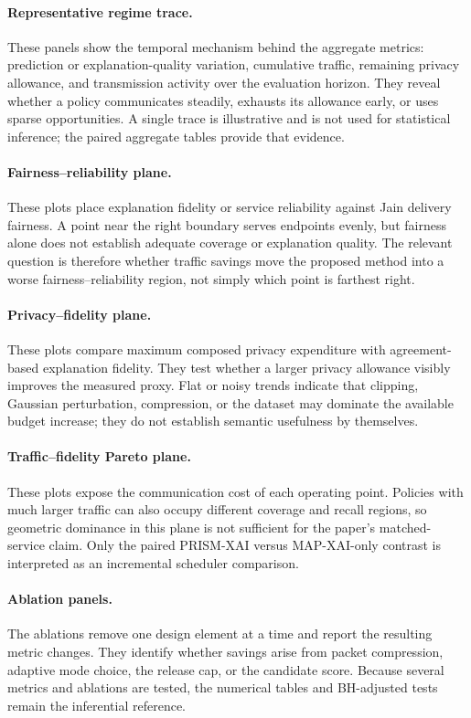 \documentclass[10pt,conference]{IEEEtran}
\begin{document}
\paragraph{Representative regime trace.}
These panels show the temporal mechanism behind the aggregate metrics:
prediction or explanation-quality variation, cumulative traffic, remaining
privacy allowance, and transmission activity over the evaluation horizon.
They reveal whether a policy communicates steadily, exhausts its allowance
early, or uses sparse opportunities. A single trace is illustrative and is
not used for statistical inference; the paired aggregate tables provide that
evidence.

\paragraph{Fairness--reliability plane.}
These plots place explanation fidelity or service reliability against Jain
delivery fairness. A point near the right boundary serves endpoints evenly,
but fairness alone does not establish adequate coverage or explanation
quality. The relevant question is therefore whether traffic savings move the
proposed method into a worse fairness--reliability region, not simply which
point is farthest right.

\paragraph{Privacy--fidelity plane.}
These plots compare maximum composed privacy expenditure with agreement-based
explanation fidelity. They test whether a larger privacy allowance visibly
improves the measured proxy. Flat or noisy trends indicate that clipping,
Gaussian perturbation, compression, or the dataset may dominate the available
budget increase; they do not establish semantic usefulness by themselves.

\paragraph{Traffic--fidelity Pareto plane.}
These plots expose the communication cost of each operating point. Policies
with much larger traffic can also occupy different coverage and recall
regions, so geometric dominance in this plane is not sufficient for the
paper's matched-service claim. Only the paired PRISM-XAI versus MAP-XAI-only
contrast is interpreted as an incremental scheduler comparison.

\paragraph{Ablation panels.}
The ablations remove one design element at a time and report the resulting
metric changes. They identify whether savings arise from packet compression,
adaptive mode choice, the release cap, or the candidate score. Because several
metrics and ablations are tested, the numerical tables and BH-adjusted tests
remain the inferential reference.
\end{document}
